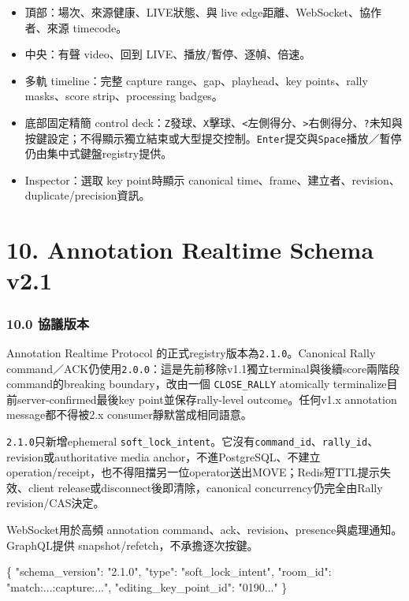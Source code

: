 \documentclass[
  9pt,
  a4paper,
]{article}
\newenvironment{Shaded}{}{}
\newcommand{\DataTypeTok}[1]{\textcolor[rgb]{0.56,0.13,0.00}{#1}}
\newcommand{\FunctionTok}[1]{\textcolor[rgb]{0.02,0.16,0.49}{#1}}
\newcommand{\StringTok}[1]{\textcolor[rgb]{0.25,0.44,0.63}{#1}}
\providecommand{\tightlist}{%
  \setlength{\itemsep}{0pt}\setlength{\parskip}{0pt}}
\begin{document}
\begin{itemize}
\tightlist
\item
  頂部：場次、來源健康、LIVE狀態、與 live
  edge距離、WebSocket、協作者、來源 timecode。
\item
  中央：有聲 video、回到 LIVE、播放/暫停、逐幀、倍速。
\item
  多軌 timeline：完整 capture range、gap、playhead、key points、rally
  masks、score strip、processing badges。
\item
  底部固定精簡 control deck：\texttt{Z}發球、\texttt{X}擊球、\texttt{\textless{}}左側得分、\texttt{\textgreater{}}右側得分、\texttt{?}未知與按鍵設定；不得顯示獨立結束或大型提交控制。\texttt{Enter}提交與\texttt{Space}播放／暫停仍由集中式鍵盤registry提供。
\item
  Inspector：選取 key point時顯示 canonical
  time、frame、建立者、revision、duplicate/precision資訊。
\end{itemize}

\section{10. Annotation Realtime Schema
v2.1}\label{10-annotation-realtime-schema-v21}

\subsubsection{10.0 協議版本}\label{100-ux5354ux8b70ux7248ux672c}

Annotation Realtime Protocol 的正式registry版本為\texttt{2.1.0}。Canonical
Rally command／ACK仍使用\texttt{2.0.0}：這是先前移除v1.1獨立terminal與後續score兩階段command的breaking
boundary，改由一個
\texttt{CLOSE\_\allowbreak{}RALLY} atomically terminalize目前server-confirmed最後key
point並保存rally-level outcome。任何v1.x annotation message都不得被2.x
consumer靜默當成相同語意。

\texttt{2.1.0}只新增ephemeral
\texttt{soft\_\allowbreak{}lock\_\allowbreak{}intent}。它沒有\texttt{command\_\allowbreak{}id}、\texttt{rally\_\allowbreak{}id}、revision或authoritative
media anchor，不進PostgreSQL、不建立operation/receipt，也不得阻擋另一位operator送出MOVE；Redis短TTL提示失效、client
release或disconnect後即清除，canonical concurrency仍完全由Rally revision/CAS決定。

WebSocket用於高頻 annotation
command、ack、revision、presence與處理通知。GraphQL提供
snapshot/refetch，不承擔逐次按鍵。

\begin{Shaded}
\begin{Highlighting}[]
\FunctionTok{\{}
  \DataTypeTok{"schema\_\allowbreak{}version"}\FunctionTok{:} \StringTok{"2.1.0"}\FunctionTok{,}
  \DataTypeTok{"type"}\FunctionTok{:} \StringTok{"soft\_\allowbreak{}lock\_\allowbreak{}intent"}\FunctionTok{,}
  \DataTypeTok{"room\_\allowbreak{}id"}\FunctionTok{:} \StringTok{"match:...:capture:..."}\FunctionTok{,}
  \DataTypeTok{"editing\_\allowbreak{}key\_\allowbreak{}point\_\allowbreak{}id"}\FunctionTok{:} \StringTok{"0190..."}
\FunctionTok{\}}
\end{Highlighting}
\end{Shaded}
\end{document}
